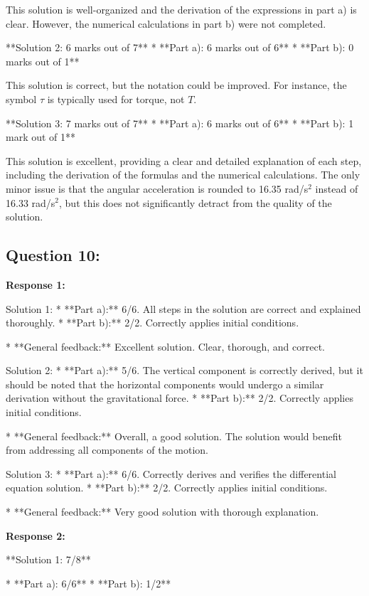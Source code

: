\documentclass[a4paper,11pt]{article}
\begin{document}
This solution is well-organized and the derivation of the expressions in part a) is clear. However, the numerical calculations in part b) were not completed.

**Solution 2: 6 marks out of 7**
* **Part a): 6 marks out of 6**
* **Part b): 0 marks out of 1**

This solution is correct, but the notation could be improved. For instance, the symbol \( \tau \) is typically used for torque, not \( T \).

**Solution 3: 7 marks out of 7**
* **Part a): 6 marks out of 6**
* **Part b): 1 mark out of 1**

This solution is excellent, providing a clear and detailed explanation of each step, including the derivation of the formulas and the numerical calculations. The only minor issue is that the angular acceleration is rounded to 16.35 rad/s\(^2\) instead of 16.33 rad/s\(^2\), but this does not significantly detract from the quality of the solution.

\subsection*{Question 10:}

\textbf{Response 1:}

Solution 1: 
* **Part a):** 6/6. All steps in the solution are correct and explained thoroughly.
* **Part b):** 2/2. Correctly applies initial conditions.

* **General feedback:** Excellent solution. Clear, thorough, and correct.

Solution 2: 
* **Part a):** 5/6. The vertical component is correctly derived, but it should be noted that the horizontal components would undergo a similar derivation without the gravitational force.
* **Part b):** 2/2. Correctly applies initial conditions.

* **General feedback:** Overall, a good solution. The solution would benefit from addressing all components of the motion.

Solution 3: 
* **Part a):** 6/6. Correctly derives and verifies the differential equation solution.
* **Part b):** 2/2. Correctly applies initial conditions.

* **General feedback:** Very good solution with thorough explanation.

\bigskip    
\textbf{Response 2:}

**Solution 1: 7/8**

*   **Part a): 6/6**
*   **Part b): 1/2**
\end{document}
